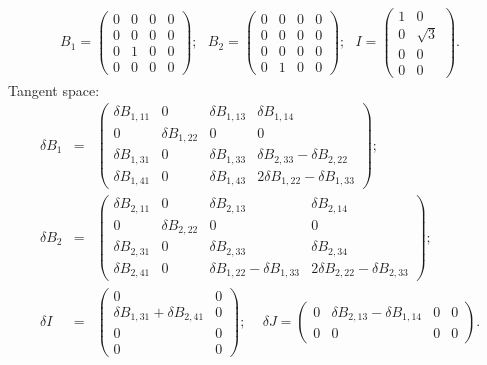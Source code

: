 \documentclass[a4paper,12pt]{article}
\begin{document}
\begin{eqnarray}
B_1=\left(\begin{array}{cccc} 0 & 0 & 0 & 0 \\ 0 & 0 & 0 & 0 \\ 0 & 1 & 0 & 0 \\
0 & 0 & 0 & 0
\end{array}\right); \, \, \, \,
B_2=\left(\begin{array}{cccc} 0 & 0 & 0 & 0 \\ 0 & 0 & 0 & 0 \\ 0 & 0 & 0 & 0 \\
0 & 1 & 0 & 0
\end{array}\right);
 \, \, \, \, I=\left(\begin{array}{cc} 1 & 0 \\ 0 & \sqrt{3} \\0 & 0 \\ 0 & 0
\end{array}\right).
\end{eqnarray}
Tangent space:
\begin{eqnarray}
\delta B_1 &=& \left(\begin{array}{cccc} \delta B_{1,11} & 0 & \delta B_{1,13} & \delta B_{1,14} \\
0 & \delta B_{1,22} & 0 & 0 \\ \delta B_{1,31} & 0 & \delta B_{1,33} & \delta B_{2,33}-\delta B_{2,22}
\\ \delta B_{1,41} & 0 & \delta B_{1,43} & 2\delta B_{1,22}-\delta B_{1,33}
\end{array}\right); \nonumber \\
\delta B_2 &=& \left(\begin{array}{cccc} \delta B_{2,11} & 0 & \delta B_{2,13} & \delta B_{2,14} \\ 0 & \delta B_{2,22} & 0 & 0 \\
\delta B_{2,31} & 0 & \delta B_{2,33} & \delta B_{2,34} \\
\delta B_{2,41} & 0 & \delta B_{1,22}-\delta B_{1,33} & 2\delta B_{2,22}-\delta B_{2,33}
\end{array}\right); \nonumber \\
\delta I &=& \left(\begin{array}{cc} 0 & 0 \\ \delta B_{1,31}+\delta B_{2,41} & 0 \\ 0 & 0 \\
0 & 0
\end{array}\right); \, \, \, \, \, \, \,
\delta J=\left(\begin{array}{cccc} 0 & \delta B_{2,13}-\delta B_{1,14} & 0 & 0 \\ 0 & 0 & 0 & 0
\end{array}\right).
\end{eqnarray}
\end{document}
